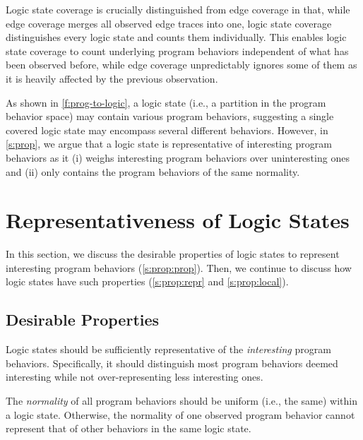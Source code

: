 \documentclass[letterpaper,twocolumn,10pt]{article}
\begin{document}
Logic state coverage is crucially distinguished from edge coverage in that, 
while edge coverage merges all observed edge traces into one, logic state
coverage distinguishes every logic state and counts them individually. This
enables logic state coverage to count underlying program behaviors independent 
of what has been observed before, while edge coverage unpredictably ignores some
of them as it is heavily affected by the previous observation.

As shown in \autoref{f:prog-to-logic}, a logic state (i.e., a partition in the
program behavior space) may contain various program behaviors, suggesting a
single covered logic state may encompass several different behaviors. However,
in \autoref{s:prop}, we argue that a logic state is representative of
interesting program behaviors as it (i) weighs interesting program behaviors
over uninteresting ones and (ii) only contains the program behaviors of the same
normality.


\section{Representativeness of Logic States}
\label{s:prop}

In this section, we discuss the desirable properties of logic states to
represent interesting program behaviors (\autoref{s:prop:prop}). Then, we
continue to discuss how logic states have such properties
(\autoref{s:prop:repr} and \ref{s:prop:local}).

\subsection{Desirable Properties}%
\label{s:prop:prop}

%
Logic states should be sufficiently representative of the \emph{interesting}
program behaviors. Specifically, it should distinguish most program behaviors
deemed interesting while not over-representing less interesting ones. 

%
The \emph{normality} of all program behaviors should be uniform (i.e., the same)
within a logic state. Otherwise, the normality of one observed program behavior
cannot represent that of other behaviors in the same logic state.
%
\end{document}
